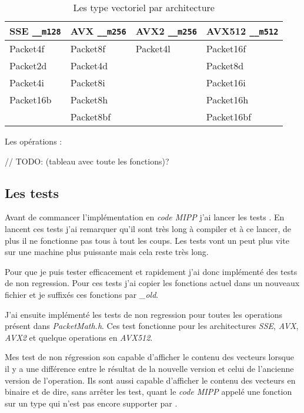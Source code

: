 \begin{table}[H]
  \label{eigenTypesTable}
  \centering
  \begin{tabular}[H]{|l|l|l|l|}
    \hline
    \textbf{SSE} \verb|__m128| & \textbf{AVX} \verb|__m256| & \textbf{AVX2} \verb|__m256| & \textbf{AVX512} \verb|__m512|\\
    \hline
    Packet4f     & Packet8f     & Packet4l      & Packet16f       \\
    \hline
    Packet2d     & Packet4d     &               & Packet8d        \\
    \hline
    Packet4i     & Packet8i     &               & Packet16i       \\
    \hline
    Packet16b    & Packet8h     &               & Packet16h       \\
    \hline
                 & Packet8bf    &               & Packet16bf      \\
    \hline
  \end{tabular}
  \caption{Les type vectoriel \Eigen par architecture}
\end{table}

Les opérations :

// TODO: (tableau avec toute les fonctions)?

\subsection{Les tests}

Avant de commancer l'implémentation en \emph{code MIPP} j'ai lancer les tests \Eigen.
En lancent ces tests j'ai remarquer qu'il sont très long à compiler et à ce lancer, de
plus il ne fonctionne pas tous à tout les coups. Les tests vont un peut plus vite sur
une machine plus puissante mais cela reste très long.

Pour que je puis tester efficacement et rapidement j'ai donc implémenté des tests de non
regression. Pour ces tests j'ai copier les fonctions actuel dans un nouveaux fichier et
je suffixés ces fonctions par \emph{_old}.

J'ai ensuite implémenté les tests de non regression pour toutes les operations présent
dans \emph{PacketMath.h}. Ces test fonctionne pour les architectures \emph{SSE}, \emph{AVX},
\emph{AVX2} et quelque operations en \emph{AVX512}.

Mes test de non régression son capable d'afficher le contenu des vecteurs lorsque il y a
une différence entre le résultat de la nouvelle version et celui de l'ancienne version
de l'operation.
Ils sont aussi capable d'afficher le contenu des vecteurs en binaire et de dire, sans
arrêter les test, quant le \emph{code MIPP} appelé une fonction \MIPP sur un type qui
n'est pas encore supporter par \MIPP.

